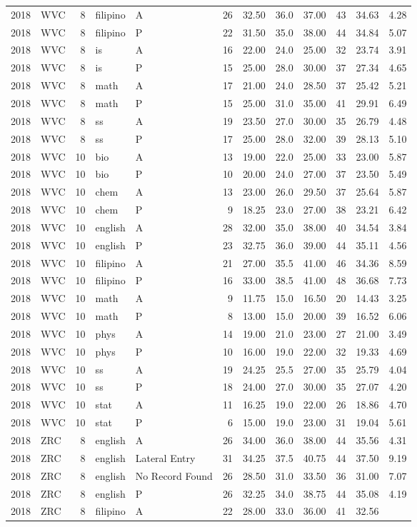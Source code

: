 \documentclass[]{article}
\begin{document}
\begin{longtable}[]{@{}rlrllrrrrrrr@{}}
2018 & WVC & 8 & filipino & A & 26 & 32.50 & 36.0 & 37.00 & 43 & 34.63 &
4.28\tabularnewline
2018 & WVC & 8 & filipino & P & 22 & 31.50 & 35.0 & 38.00 & 44 & 34.84 &
5.07\tabularnewline
2018 & WVC & 8 & is & A & 16 & 22.00 & 24.0 & 25.00 & 32 & 23.74 &
3.91\tabularnewline
2018 & WVC & 8 & is & P & 15 & 25.00 & 28.0 & 30.00 & 37 & 27.34 &
4.65\tabularnewline
2018 & WVC & 8 & math & A & 17 & 21.00 & 24.0 & 28.50 & 37 & 25.42 &
5.21\tabularnewline
2018 & WVC & 8 & math & P & 15 & 25.00 & 31.0 & 35.00 & 41 & 29.91 &
6.49\tabularnewline
2018 & WVC & 8 & ss & A & 19 & 23.50 & 27.0 & 30.00 & 35 & 26.79 &
4.48\tabularnewline
2018 & WVC & 8 & ss & P & 17 & 25.00 & 28.0 & 32.00 & 39 & 28.13 &
5.10\tabularnewline
2018 & WVC & 10 & bio & A & 13 & 19.00 & 22.0 & 25.00 & 33 & 23.00 &
5.87\tabularnewline
2018 & WVC & 10 & bio & P & 10 & 20.00 & 24.0 & 27.00 & 37 & 23.50 &
5.49\tabularnewline
2018 & WVC & 10 & chem & A & 13 & 23.00 & 26.0 & 29.50 & 37 & 25.64 &
5.87\tabularnewline
2018 & WVC & 10 & chem & P & 9 & 18.25 & 23.0 & 27.00 & 38 & 23.21 &
6.42\tabularnewline
2018 & WVC & 10 & english & A & 28 & 32.00 & 35.0 & 38.00 & 40 & 34.54 &
3.84\tabularnewline
2018 & WVC & 10 & english & P & 23 & 32.75 & 36.0 & 39.00 & 44 & 35.11 &
4.56\tabularnewline
2018 & WVC & 10 & filipino & A & 21 & 27.00 & 35.5 & 41.00 & 46 & 34.36
& 8.59\tabularnewline
2018 & WVC & 10 & filipino & P & 16 & 33.00 & 38.5 & 41.00 & 48 & 36.68
& 7.73\tabularnewline
2018 & WVC & 10 & math & A & 9 & 11.75 & 15.0 & 16.50 & 20 & 14.43 &
3.25\tabularnewline
2018 & WVC & 10 & math & P & 8 & 13.00 & 15.0 & 20.00 & 39 & 16.52 &
6.06\tabularnewline
2018 & WVC & 10 & phys & A & 14 & 19.00 & 21.0 & 23.00 & 27 & 21.00 &
3.49\tabularnewline
2018 & WVC & 10 & phys & P & 10 & 16.00 & 19.0 & 22.00 & 32 & 19.33 &
4.69\tabularnewline
2018 & WVC & 10 & ss & A & 19 & 24.25 & 25.5 & 27.00 & 35 & 25.79 &
4.04\tabularnewline
2018 & WVC & 10 & ss & P & 18 & 24.00 & 27.0 & 30.00 & 35 & 27.07 &
4.20\tabularnewline
2018 & WVC & 10 & stat & A & 11 & 16.25 & 19.0 & 22.00 & 26 & 18.86 &
4.70\tabularnewline
2018 & WVC & 10 & stat & P & 6 & 15.00 & 19.0 & 23.00 & 31 & 19.04 &
5.61\tabularnewline
2018 & ZRC & 8 & english & A & 26 & 34.00 & 36.0 & 38.00 & 44 & 35.56 &
4.31\tabularnewline
2018 & ZRC & 8 & english & Lateral Entry & 31 & 34.25 & 37.5 & 40.75 &
44 & 37.50 & 9.19\tabularnewline
2018 & ZRC & 8 & english & No Record Found & 26 & 28.50 & 31.0 & 33.50 &
36 & 31.00 & 7.07\tabularnewline
2018 & ZRC & 8 & english & P & 26 & 32.25 & 34.0 & 38.75 & 44 & 35.08 &
4.19\tabularnewline
2018 & ZRC & 8 & filipino & A & 22 & 28.00 & 33.0 & 36.00 & 41 & 32.56 &

\end{longtable}
\end{document}
